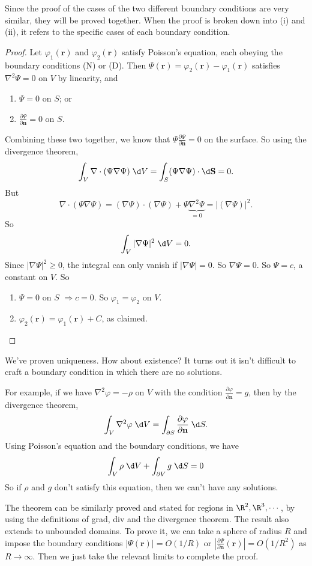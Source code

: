 \documentclass[a4paper]{article}
\begin{document}
Since the proof of the cases of the two different boundary conditions are very similar, they will be proved together. When the proof is broken down into (i) and (ii), it refers to the specific cases of each boundary condition.
\begin{proof}
  Let $\varphi_1(\mathbf{r})$ and $\varphi_2(\mathbf{r})$ satisfy Poisson's equation, each obeying the boundary conditions (N) or (D). Then $\Psi(\mathbf{r}) = \varphi_2(\mathbf{r}) - \varphi_1(\mathbf{r})$ satisfies $\nabla^2\Psi = 0$ on $V$ by linearity, and
  \begin{enumerate}
    \item $\Psi = 0$ on $S$; or
    \item $\frac{\partial \Psi}{\partial \mathbf{n}} = 0$ on $S$.
  \end{enumerate}
  Combining these two together, we know that $\Psi\frac{\partial \Psi}{\partial \mathbf{n}} = 0$ on the surface. So using the divergence theorem,
  \[
    \int_V \nabla\cdot (\Psi\nabla \Psi) \;\d V = \int_S (\Psi\nabla\Psi)\cdot \d \mathbf{S} = 0.
  \]
  But
  \[
    \nabla\cdot(\Psi\nabla \Psi) = (\nabla\Psi)\cdot (\nabla\Psi) + \Psi\underbrace{\nabla^2\Psi}_{=0} = |(\nabla\Psi)|^2.
  \]
  So
  \[
    \int_V |\nabla \Psi|^2\;\d V = 0.
  \]
  Since $|\nabla\Psi|^2 \geq 0$, the integral can only vanish if $|\nabla \Psi| = 0$. So $\nabla\Psi = 0$. So $\Psi = c$, a constant on $V$. So
  \begin{enumerate}
    \item $\Psi = 0$ on $S$ $\Rightarrow c = 0$. So $\varphi_1 = \varphi_2$ on $V$.
    \item $\varphi_2(\mathbf{r}) = \varphi_1(\mathbf{r}) + C$, as claimed.
  \end{enumerate}
\end{proof}
We've proven uniqueness. How about existence? It turns out it isn't difficult to craft a boundary condition in which there are no solutions.

For example, if we have $\nabla^2 \varphi = -\rho$ on $V$ with the condition $\frac{\partial \varphi}{\partial \mathbf{n}} = g$, then by the divergence theorem,
\[
  \int_V \nabla^2\varphi \;\d V = \int_{\partial S} \frac{\partial \varphi}{\partial \mathbf{n}}\;\d S.
\]
Using Poisson's equation and the boundary conditions, we have
\[
  \int_V \rho \;\d V + \int_{\partial V} g\;\d S = 0
\]
So if $\rho$ and $g$ don't satisfy this equation, then we can't have any solutions.

The theorem can be similarly proved and stated for regions in $\R^2, \R^3, \cdots$, by using the definitions of grad, div and the divergence theorem. The result also extends to unbounded domains. To prove it, we can take a sphere of radius $R$ and impose the boundary conditions $|\Psi(\mathbf{r})| = O(1/R)$ or $|\frac{\partial \Psi}{\partial \mathbf{n}}(\mathbf{r})| = O(1/R^2)$ as $R\to \infty$. Then we just take the relevant limits to complete the proof.
\end{document}
